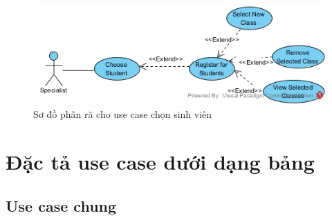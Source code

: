 \documentclass[12pt]{book}
\begin{document}
  \FloatBarrier
  \begin{figure}[ht]
    \centering
    \includegraphics[scale=0.5]{../pictures/projectdiagrams/Choose-Student-uc-destructing.jpg}
    \caption{Sơ đồ phân rã cho use case chọn sinh viên}
  \end{figure}
  \FloatBarrier

  \newpage
  \section{Đặc tả use case dưới dạng bảng}

  \subsection{Use case chung}
\end{document}
